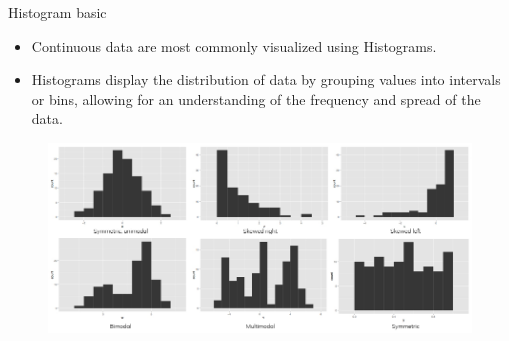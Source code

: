 \documentclass[
  ignorenonframetext,
]{beamer}
\providecommand{\tightlist}{%
  \setlength{\itemsep}{0pt}\setlength{\parskip}{0pt}}
\begin{document}
\begin{frame}{Histogram basic}
\label{histogram-basic}
\begin{itemize}
\tightlist
\item
  Continuous data are most commonly visualized using Histograms.
\end{itemize}

\begin{itemize}
\tightlist
\item
  Histograms display the distribution of data by grouping values into
  intervals or bins, allowing for an understanding of the frequency and
  spread of the data.
\end{itemize}

\begin{figure}

{\centering \includegraphics[width=0.8\linewidth]{fig/Histogram} 

}

\end{figure}
\end{frame}
\end{document}
